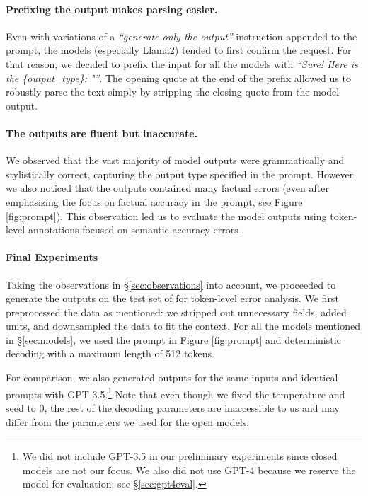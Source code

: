 \paragraph{Prefixing the output makes parsing easier.} Even with variations of a \textit{``generate only the output''} instruction appended to the prompt, the models (especially Llama2) tended to first confirm the request. For that reason, we decided to prefix the input for all the models with \textit{``Sure! Here is the \{output\_type\}: "''}. The opening quote at the end of the prefix allowed us to robustly parse the text simply by stripping the closing quote from the model output.

\paragraph{The outputs are fluent but inaccurate.} We observed that the vast majority of model outputs were grammatically and stylistically correct, capturing the output type specified in the prompt. However, we also noticed that the outputs contained many factual errors (even after emphasizing the focus on factual accuracy in the prompt, see Figure \ref{fig:prompt}). This observation led us to evaluate the model outputs using token-level annotations focused on semantic accuracy errors \cite{reiterSharedTaskEvaluating2020}.



\paragraph{Final Experiments}
\label{sec:basic}

Taking the observations in §\ref{sec:observations} into account, we proceeded to generate the outputs on the test set of \benchmark for token-level error analysis. We first preprocessed the data as mentioned: we stripped out unnecessary fields, added units, and downsampled the data to fit the context. For all the models mentioned in §\ref{sec:models}, we used the prompt in Figure \ref{fig:prompt} and deterministic decoding with a maximum length of 512 tokens.

For comparison, we also generated outputs for the same inputs and identical prompts with GPT-3.5.\footnote{We did not include GPT-3.5 in our preliminary experiments since closed models are not our focus. We also did not use GPT-4 because we reserve the model for evaluation; see §\ref{sec:gpt4eval}.} Note that even though we fixed the temperature and seed to $0$, the rest of the decoding parameters are inaccessible to us and may differ from the parameters we used for the open models.





